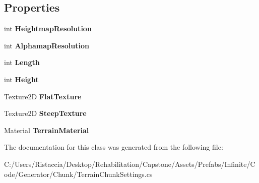 \subsection*{Properties}
\begin{DoxyCompactItemize}
\item 
\mbox{\label{class_terrain_generator_1_1_terrain_chunk_settings_a0e288c1a8a26b9dd18cb43e5a753faa0}} 
int {\bfseries Heightmap\+Resolution}
\item 
\mbox{\label{class_terrain_generator_1_1_terrain_chunk_settings_a2e852737019a7c801abc2a1fc4355eb0}} 
int {\bfseries Alphamap\+Resolution}
\item 
\mbox{\label{class_terrain_generator_1_1_terrain_chunk_settings_aeec24b30b9da192b40fe693863b78b29}} 
int {\bfseries Length}
\item 
\mbox{\label{class_terrain_generator_1_1_terrain_chunk_settings_aad412edf1ce162c41774c1b83d55377b}} 
int {\bfseries Height}
\item 
\mbox{\label{class_terrain_generator_1_1_terrain_chunk_settings_ad694c2353480f85e0b08112e263368db}} 
Texture2D {\bfseries Flat\+Texture}
\item 
\mbox{\label{class_terrain_generator_1_1_terrain_chunk_settings_a5456c14e62bcd7614d9816895c267906}} 
Texture2D {\bfseries Steep\+Texture}
\item 
\mbox{\label{class_terrain_generator_1_1_terrain_chunk_settings_aea8f26831185fb5286e77ebc9ebdf9b8}} 
Material {\bfseries Terrain\+Material}
\end{DoxyCompactItemize}


The documentation for this class was generated from the following file\+:\begin{DoxyCompactItemize}
\item 
C\+:/\+Users/\+Ristaccia/\+Desktop/\+Rehabilitation/\+Capstone/\+Assets/\+Prefabs/\+Infinite/\+Code/\+Generator/\+Chunk/Terrain\+Chunk\+Settings.\+cs\end{DoxyCompactItemize}
